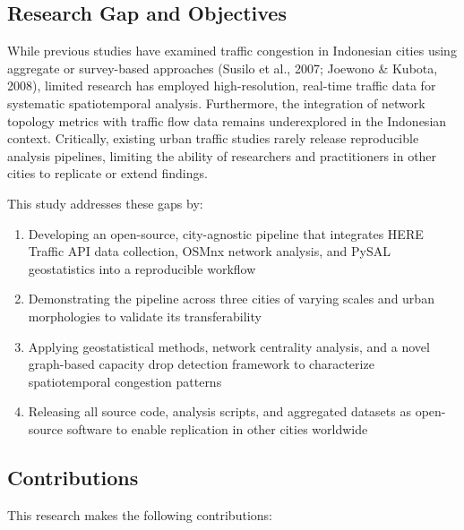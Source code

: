 \documentclass[12pt,a4paper]{article}
\begin{document}
\subsection{Research Gap and Objectives}

While previous studies have examined traffic congestion in Indonesian cities using aggregate or survey-based approaches (Susilo et al., 2007; Joewono \& Kubota, 2008), limited research has employed high-resolution, real-time traffic data for systematic spatiotemporal analysis. Furthermore, the integration of network topology metrics with traffic flow data remains underexplored in the Indonesian context. Critically, existing urban traffic studies rarely release reproducible analysis pipelines, limiting the ability of researchers and practitioners in other cities to replicate or extend findings.

This study addresses these gaps by:

\begin{enumerate}
\def\labelenumi{\arabic{enumi}.}

\item
  Developing an open-source, city-agnostic pipeline that integrates HERE Traffic API data collection, OSMnx network analysis, and PySAL geostatistics into a reproducible workflow
\item
  Demonstrating the pipeline across three cities of varying scales and urban morphologies to validate its transferability
\item
  Applying geostatistical methods, network centrality analysis, and a novel graph-based capacity drop detection framework to characterize spatiotemporal congestion patterns
\item
  Releasing all source code, analysis scripts, and aggregated datasets as open-source software to enable replication in other cities worldwide
\end{enumerate}

\subsection{Contributions}

This research makes the following contributions:
\end{document}
